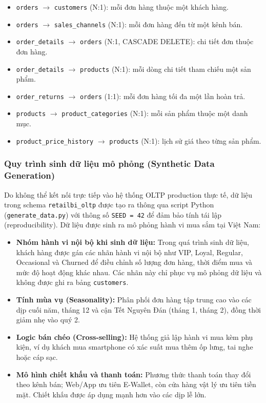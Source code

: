 \documentclass[12pt,a4paper]{article}
\newcommand{\code}[1]{\texttt{#1}}
\begin{document}
\begin{itemize}
    \item \code{orders} $\rightarrow$ \code{customers} (N:1): mỗi đơn hàng thuộc một khách hàng.
    \item \code{orders} $\rightarrow$ \code{sales\_channels} (N:1): mỗi đơn hàng đến từ một kênh bán.
    \item \code{order\_details} $\rightarrow$ \code{orders} (N:1, CASCADE DELETE): chi tiết đơn thuộc đơn hàng.
    \item \code{order\_details} $\rightarrow$ \code{products} (N:1): mỗi dòng chi tiết tham chiếu một sản phẩm.
    \item \code{order\_returns} $\rightarrow$ \code{orders} (1:1): mỗi đơn hàng tối đa một lần hoàn trả.
    \item \code{products} $\rightarrow$ \code{product\_categories} (N:1): mỗi sản phẩm thuộc một danh mục.
    \item \code{product\_price\_history} $\rightarrow$ \code{products} (N:1): lịch sử giá theo từng sản phẩm.
\end{itemize}

\subsubsection{Quy trình sinh dữ liệu mô phỏng (Synthetic Data Generation)}

Do không thể kết nối trực tiếp vào hệ thống OLTP production thực tế, dữ liệu trong schema \code{retailbi\_oltp} được tạo ra thông qua script Python (\code{generate\_data.py}) với thông số \code{SEED = 42} để đảm bảo tính tái lập (reproducibility). Dữ liệu được sinh ra mô phỏng hành vi mua sắm tại Việt Nam:

\begin{itemize}
    \item \textbf{Nhóm hành vi nội bộ khi sinh dữ liệu:} Trong quá trình sinh dữ liệu, khách hàng được gán các nhãn hành vi nội bộ như VIP, Loyal, Regular, Occasional và Churned để điều chỉnh số lượng đơn hàng, thời điểm mua và mức độ hoạt động khác nhau. Các nhãn này chỉ phục vụ mô phỏng dữ liệu và không được ghi ra bảng \code{customers}.
    \item \textbf{Tính mùa vụ (Seasonality):} Phân phối đơn hàng tập trung cao vào các dịp cuối năm, tháng 12 và cận Tết Nguyên Đán (tháng 1, tháng 2), đồng thời giảm nhẹ vào quý 2.
    \item \textbf{Logic bán chéo (Cross-selling):} Hệ thống giả lập hành vi mua kèm phụ kiện, ví dụ khách mua smartphone có xác suất mua thêm ốp lưng, tai nghe hoặc cáp sạc.
    \item \textbf{Mô hình chiết khấu và thanh toán:} Phương thức thanh toán thay đổi theo kênh bán; Web/App ưu tiên E-Wallet, còn cửa hàng vật lý ưu tiên tiền mặt. Chiết khấu được áp dụng mạnh hơn vào các dịp lễ lớn.
\end{itemize}
\end{document}
